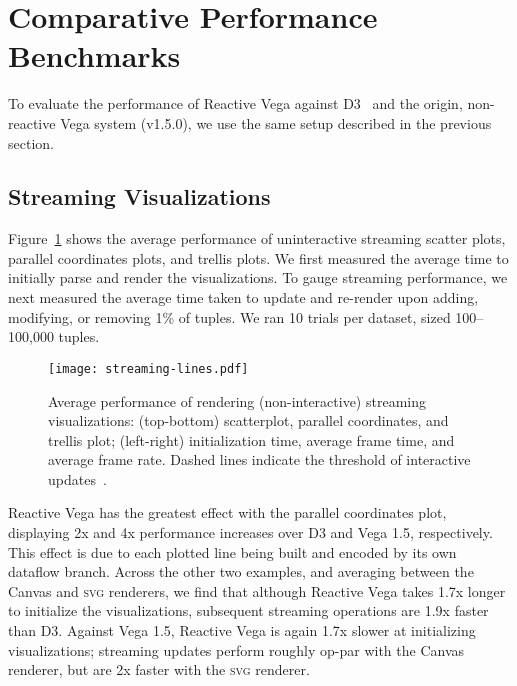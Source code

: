 
\vspace{-20pt}

\section{Comparative Performance Benchmarks}
\label{sec:vg:performance}

\vspace{-10pt}

To evaluate the performance of Reactive Vega against D3~\cite{bostock:d3} and
the origin, non-reactive Vega system (v1.5.0), we use the same setup described
in the previous section.

\vspace{-10pt}

\subsection{Streaming Visualizations}

\vspace{-7pt}

Figure~\ref{fig:vg:static_benchmark} shows the average performance of
uninteractive streaming scatter plots, parallel coordinates plots, and trellis
plots. We first measured the average time to initially parse and render the
visualizations. To gauge streaming performance, we next measured the average
time taken to update and re-render upon adding, modifying, or removing 1\% of
tuples. We ran 10 trials per dataset, sized 100--100,000 tuples.

\begin{figure}[t!]
  \centering
  \texttt{[image: streaming-lines.pdf]}
  \caption{Average performance of rendering (non-interactive) streaming visualizations:
(top-bottom) scatterplot, parallel coordinates, and trellis plot; (left-right)
initialization time, average frame time, and average frame rate. Dashed lines
indicate the threshold of interactive updates~\cite{card:modelhuman}.}
  \label{fig:vg:static_benchmark}
\end{figure}

Reactive Vega has the greatest effect with the parallel coordinates plot,
displaying 2x and 4x performance increases over D3 and Vega 1.5, respectively.
This effect is due to each plotted line being built and encoded by its own
dataflow branch. Across the other two examples, and averaging between the Canvas
and \textsc{svg} renderers, we find that although Reactive Vega takes 1.7x
longer to initialize the visualizations, subsequent streaming operations are
1.9x faster than D3. Against Vega 1.5, Reactive Vega is again 1.7x slower at
initializing visualizations; streaming updates perform roughly op-par with the
Canvas renderer, but are 2x faster with the \textsc{svg} renderer.

